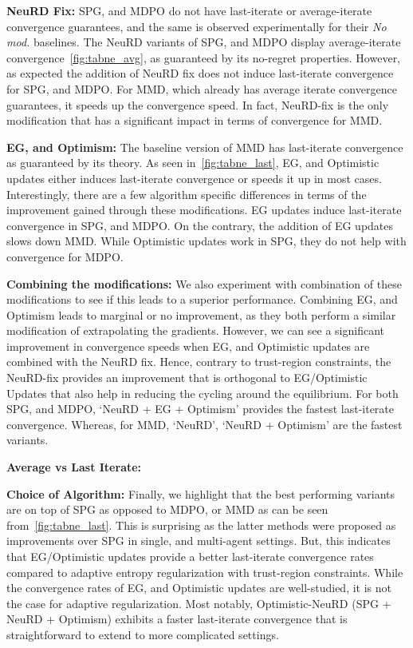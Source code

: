 \textbf{NeuRD Fix:}
SPG, and MDPO do not have last-iterate or average-iterate convergence guarantees, and the same is
observed experimentally for their \textit{No mod.
} baselines.
The NeuRD variants of SPG, and MDPO display average-iterate convergence~\ref{fig:tabne_avg},
as guaranteed by its no-regret properties.
However, as expected the addition of NeuRD fix does not induce last-iterate convergence for SPG,
and MDPO.
For MMD, which already has average iterate convergence guarantees, it speeds up the convergence
speed.
In fact, NeuRD-fix is the only modification that has a significant impact in terms of convergence
for MMD.

\textbf{EG, and Optimism:}
The baseline version of MMD has last-iterate convergence as guaranteed by its theory.
As seen in~\ref{fig:tabne_last}, EG, and Optimistic updates either induces last-iterate convergence
or speeds it up in most cases.
Interestingly, there are a few algorithm specific differences in terms of the improvement gained
through these modifications.
EG updates induce last-iterate convergence in SPG, and MDPO.
On the contrary, the addition of EG updates slows down MMD.
While Optimistic updates work in SPG, they do not help with convergence for MDPO.

\textbf{Combining the modifications:}
We also experiment with combination of these modifications to see if this leads to a superior
performance.
Combining EG, and Optimism leads to marginal or no improvement, as they both perform a similar
modification of extrapolating the gradients.
However, we can see a significant improvement in convergence speeds when EG, and Optimistic updates
are combined with the NeuRD fix.
Hence, contrary to trust-region constraints, the NeuRD-fix provides an improvement that is
orthogonal to EG/Optimistic Updates that also help in reducing the cycling around the equilibrium.
For both SPG, and MDPO, `NeuRD + EG + Optimism' provides the fastest last-iterate convergence.
Whereas, for MMD, `NeuRD', `NeuRD + Optimism' are the fastest variants.

\textbf{Average vs Last Iterate:}

\textbf{Choice of Algorithm:} Finally, we highlight that the best performing variants are on top of SPG as opposed to MDPO, or
MMD as can be seen from~\ref{fig:tabne_last}.
This is surprising as the latter methods were proposed as improvements over SPG in single, and
multi-agent settings.
But, this indicates that EG/Optimistic updates provide a better last-iterate convergence rates
compared to adaptive entropy regularization with trust-region constraints.
While the convergence rates of EG, and Optimistic updates are well-studied, it is not the case for
adaptive regularization.
Most notably, Optimistic-NeuRD (SPG + NeuRD + Optimism) exhibits a faster last-iterate convergence
that is straightforward to extend to more complicated settings.


